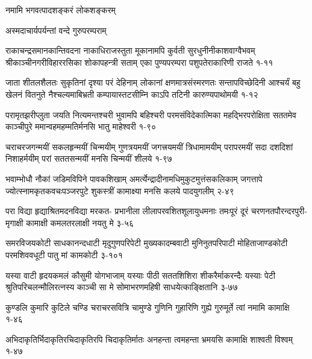 {नमामि भगवत्पादशङ्करं लोकशङ्करम्}

{अस्मदाचार्यपर्यन्तां वन्दे गुरुपरम्पराम्}



\annofourlineindentedshloka
{राकाचन्द्रसमानकान्तिवदना नाकाधिराजस्तुता}
{मूकानामपि कुर्वती सुरधुनीनीकाशवाग्वैभवम्}
{श्रीकाञ्चीनगरीविहाररसिका शोकापहन्त्री सताम्}
{एका पुण्यपरम्परा पशुपतेराकारिणी राजते}
{१-११}

\annofourlineindentedshloka
{जाता शीतलशैलतः सुकृतिनां दृश्या परं देहिनाम्}
{लोकानां क्षणमात्रसंस्मरणतः सन्तापविच्छेदिनी}
{आश्चर्यं बहु खेलनं वितनुते नैश्चल्यमाबिभ्रती}
{कम्पायास्तटसीम्नि काऽपि तटिनी कारुण्यपाथोमयी}
{१-१२}

\annofourlineindentedshloka
{परामृतझरीप्लुता जयति नित्यमन्तश्चरी}
{भुवामपि बहिश्चरी परमसंविदेकात्मिका}
{महद्भिरपरोक्षिता सततमेव काञ्चीपुरे}
{ममान्वहमहम्मतिर्मनसि भातु माहेश्वरी}
{१-९०}

\annofourlineindentedshloka
{चराचरजगन्मयीं सकलहृन्मयीं चिन्मयीम्}
{गुणत्रयमयीं जगत्त्रयमयीं त्रिधामामयीम्}
{परापरमयीं सदा दशदिशां निशाहर्मयीम्}
{परां सततसन्मयीं मनसि चिन्मयीं शीलये}
{१-९७}

\annofourlineindentedshloka
{भवाम्भोधौ नौकां जडिमविपिने पावकशिखाम्}
{अमर्त्येन्द्रादीनामधिमुकुटमुत्तंसकलिकाम्}
{जगत्तापे ज्योत्स्नामकृतकवचःपञ्जरपुटे}
{शुकस्त्रीं कामाक्ष्या मनसि कलये पादयुगलीम्}
{२-४९}

\annofourlineindentedshloka
{परा विद्या हृद्याश्रितमदनविद्या मरकत-}
{प्रभानीला लीलापरवशितशूलायुधमनाः}
{तमःपूरं दूरं चरणनतपौरन्दरपुरी-}
{मृगाक्षी कामाक्षी कमलतरलाक्षी नयतु मे}
{३-५६}

\annofourlineindentedshloka
{समरविजयकोटी साधकानन्दधाटी}
{मृदुगुणपरिपेटी मुख्यकादम्बवाटी}
{मुनिनुतपरिपाटी मोहिताजाण्डकोटी}
{परमशिववधूटी पातु मां कामकोटी}
{३-१०१}

\annofourlineindentedshloka
{यस्या वाटी हृदयकमलं कौसुमी योगभाजाम्}
{यस्याः पीठी सततशिशिरा शीकरैर्माकरन्दैः}
{यस्याः पेटी श्रुतिपरिचलन्मौलिरत्नस्य काञ्ची}
{सा मे सोमाभरणमहिषी साधयेत्काङ्क्षितानि}
{३-७७}

\annotwolineshloka
{कुण्डलि कुमारि कुटिले चण्डि चराचरसवित्रि चामुण्डे}
{गुणिनि गुहारिणि गुह्ये गुरुमूर्ते त्वां नमामि कामाक्षि}
{१-४६}

\annotwolineshloka
{अभिदाकृतिर्भिदाकृतिरचिदाकृतिरपि चिदाकृतिर्मातः}
{अनहन्ता त्वमहन्ता भ्रमयसि कामाक्षि शाश्वती विश्वम्}
{१-४७}

